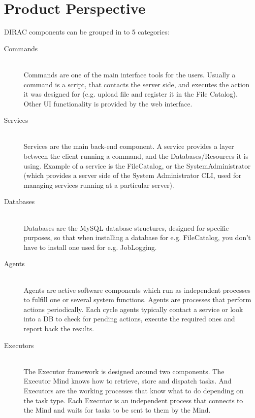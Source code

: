 \documentclass{scrreprt}
\begin{document}
\section{Product Perspective}
DIRAC components can be grouped in to 5 categories: 
\begin{description}

\item[Commands] \hfill \\
Commands are one of the main interface tools for the users. Usually a command is a script, that contacts the server side, and executes the action it was designed for (e.g. upload file and register it in the File Catalog). Other UI functionality is provided by the web interface.
\item[Services] \hfill \\
Services are the main back-end component. A service provides a layer between the client running a command, and the Databases/Resources it is using. Example of a service is the FileCatalog, or the SystemAdministrator (which provides a server side of the System Administrator CLI, used for managing services running at a particular server).
\item[Databases] \hfill \\
Databases are the MySQL database structures, designed for specific purposes, so that when installing a database for e.g. FileCatalog, you don't have to install one used for e.g. JobLogging.
\item[Agents] \hfill \\
Agents are active software components which run as independent processes to fulfill one or several system functions. Agents are processes that perform actions periodically. Each cycle agents typically contact a service or look into a DB to check for pending actions, execute the required ones and report back the results. 
\item[Executors] \hfill \\
The Executor framework is designed around two components. The Executor Mind knows how to retrieve, store and dispatch tasks. And Executors are the working processes that know what to do depending on the task type. Each Executor is an independent process that connects to the Mind and waits for tasks to be sent to them by the Mind.
\end{description}
\end{document}
